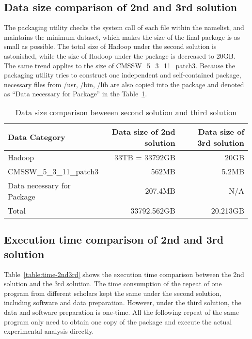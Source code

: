 \documentclass{article}
\begin{document}
\subsection{ Data size comparison of 2nd and 3rd solution}
\indent The packaging utility checks the system call of each file within the namelist, and maintains the minimum dataset, which makes the size of the final package is as small as possible. The total size of Hadoop under the second solution is astonished, while the size of Hadoop under the package is decreased to 20GB. The same trend applies to the size of CMSSW\_5\_3\_11\_patch3. Because the packaging utility tries to construct one independent and self-contained package, necessary files  from /usr, /bin, /lib are also copied into the package and denoted as “Data necessary for Package” in the Table~\ref{table:datasize-2nd3rd}.\\

\begin{table}
    \centering
    \begin{tabular}{|l|r|r|}
    \hline
     Data Category & Data size of 2nd solution & Data size of 3rd solution \\ \hline
     Hadoop & 33TB = 33792GB & 20GB \\ \hline
     CMSSW\_5\_3\_11\_patch3 & 562MB & 5.2MB \\ \hline
     Data necessary for Package & 207.4MB & N/A \\ \hline
     Total & 33792.562GB & 20.213GB \\ \hline
    \end{tabular}
    \caption{Data size comparison beweeen second solution and third solution}
    \label{table:datasize-2nd3rd}
\end{table}

\subsection{Execution time comparison of 2nd and 3rd solution}
\indent Table~\ref{table:time-2nd3rd} shows the execution time comparison between the 2nd solution and the 3rd solution. The time consumption of the repeat of one program from different scholars kept the same under the second solution, including software and data preparation. However, under the third solution, the data and software preparation is one-time. All the following repeat of the same program only need to obtain one copy of the package and execute the actual experimental analysis directly.\\
\end{document}
